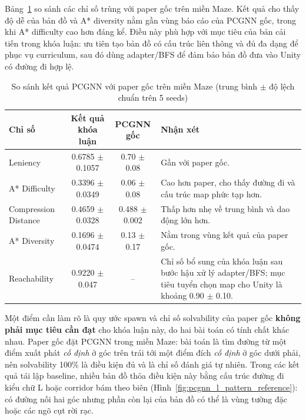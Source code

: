 Bảng~\ref{tab:pcgnn_paper_comparison} so sánh các chỉ số trùng với paper gốc trên miền Maze. Kết quả cho thấy độ dễ của bản đồ và A* diversity nằm gần vùng báo cáo của PCGNN gốc, trong khi A* difficulty cao hơn đáng kể. Điều này phù hợp với mục tiêu của bản cải tiến trong khóa luận: ưu tiên tạo bản đồ có cấu trúc liên thông và đủ đa dạng để phục vụ curriculum, sau đó dùng adapter/BFS để đảm bảo bản đồ đưa vào Unity có đường đi hợp lệ.

\begin{table}[H]
    \centering
    \small
    \caption{So sánh kết quả PCGNN với paper gốc trên miền Maze (trung bình $\pm$ độ lệch chuẩn trên 5 seeds)}
    \label{tab:pcgnn_paper_comparison}
    \begin{tabular}{l c c p{5.8cm}}
        \toprule
        \textbf{Chỉ số} & \textbf{Kết quả khóa luận} & \textbf{PCGNN gốc} & \textbf{Nhận xét} \\
        \midrule
        Leniency & 0.6785 $\pm$ 0.1057 & 0.70 $\pm$ 0.08 & Gần với paper gốc. \\
        A* Difficulty & 0.3396 $\pm$ 0.0349 & 0.06 $\pm$ 0.08 & Cao hơn paper, cho thấy đường đi và cấu trúc map phức tạp hơn. \\
        Compression Distance & 0.4659 $\pm$ 0.0328 & 0.488 $\pm$ 0.002 & Thấp hơn nhẹ về trung bình và dao động lớn hơn. \\
        A* Diversity & 0.1696 $\pm$ 0.0474 & 0.13 $\pm$ 0.17 & Nằm trong vùng kết quả của paper gốc. \\
        Reachability & 0.9220 $\pm$ 0.047 & -- & Chỉ số bổ sung của khóa luận sau bước hậu xử lý adapter/BFS; mục tiêu tuyển chọn map cho Unity là khoảng 0.90 $\pm$ 0.10. \\
        \bottomrule
    \end{tabular}
\end{table}

Một điểm cần làm rõ là quy ước spawn và chỉ số solvability của paper gốc \textbf{không phải mục tiêu cần đạt} cho khóa luận này, do hai bài toán có tính chất khác nhau. Paper gốc đặt PCGNN trong miền Maze: bài toán là tìm đường từ một điểm xuất phát \emph{cố định} ở góc trên trái tới một điểm đích \emph{cố định} ở góc dưới phải, nên solvability 100\% là điều kiện đủ và là chỉ số đánh giá tự nhiên. Trong các kết quả tái lập baseline, nhiều bản đồ thỏa điều kiện này bằng cấu trúc đường đi kiểu chữ L hoặc corridor bám theo biên (Hình~\ref{fig:pcgnn_l_pattern_reference}): có đường nối hai góc nhưng phần còn lại của bản đồ có thể là vùng tường đặc hoặc các ngõ cụt rời rạc.

